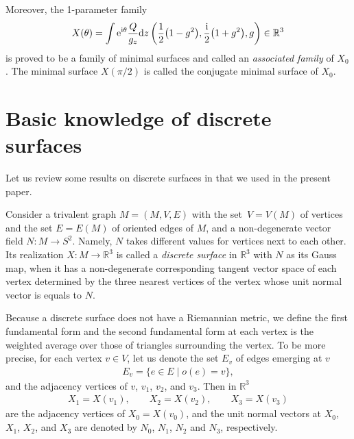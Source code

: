 \documentclass[pdftex]{sigma}
\newcommand{\R}{\mathbb{R}}
\newcommand{\ii}{{\mathrm{i}}}
\let\Re\relax
\DeclareMathOperator{\Re}{Re}
\let\Re\relax
\DeclareMathOperator{\Re}{{\mathrm Re}}
\newcommand{\1}{{\bf 1}}
\numberwithin{equation}{section}
\begin{document}
Moreover, the 1-parameter family
\begin{displaymath}
 X(\theta) = \Re \int {\rm e}^{\ii \theta}\frac{Q}{g_z}{\rm d}z
 \left(
 \frac{1}{2}\big(1-g^2\big), \frac{\ii}{2}\big(1+g^2\big), g
 \right)
 \in \R^3
\end{displaymath}
is proved to be a family of minimal surfaces and called an {\em associated family} of $X_0$.
The minimal surface $X(\pi/2)$ is called the conjugate minimal surface of $X_0$.

\section{Basic knowledge of discrete surfaces}
Let us review some results on discrete surfaces in \cite{kotani-naito-omori, kotani-naito-tao, tao} that we used in the present paper.

\begin{Definition}
 Consider a trivalent graph $M=(M, V, E)$ with the set~${V=V(M)}$ of vertices and the set $E=E(M)$ of oriented edges of $M$,
 and a non-degenerate vector field $N\colon M \to S^2$.
 Namely, $N$ takes different values for vertices next to each other.
 Its realization $X\colon M \to \R^3$ is called a {\em discrete surface} in $\R^3$ with $N$ as its Gauss map,
 when it has a non-degenerate corresponding tangent vector space of each vertex determined
 by the three nearest vertices of the vertex whose unit normal vector is equals to $N$.
\end{Definition}

Because a discrete surface does not have a Riemannian metric,
we define the first fundamental form and the second fundamental form at each vertex is
the weighted average over those of triangles surrounding the vertex. To be more precise,
for each vertex $v \in V$, let us denote the set $E_v$ of edges emerging at $v$
\begin{gather*}
 E_v = \{ e \in E \mid o(e ) =v \},
\end{gather*}
and the adjacency vertices of $v$, $v_1$, $v_2$, and $v_3$.
Then in $\R^3$
\begin{gather*}
 X_1 = X (v_1),
 \qquad
 X_2 = X (v_2),
 \qquad
 X_3 = X (v_3)
\end{gather*}
are the adjacency vertices of $X_0= X(v_0)$,
and the unit normal vectors at $X_0$, $X_1$, $X_2$, and $X_3$ are denoted by $N_0$, $N_1$, $N_2$ and $N_3$, respectively.
\end{document}
